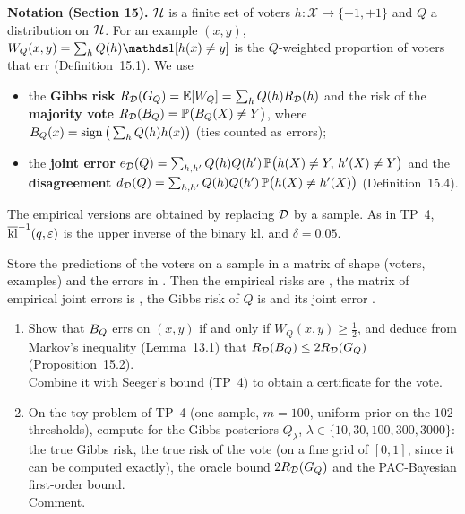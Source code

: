 \documentclass[a4paper,11pt]{article}
\begin{document}
\medskip
\noindent\textbf{Notation (Section 15).} $\mathcal{H}$ is a finite set of voters $h:\mathcal X\to\{-1,+1\}$ and $Q$ a
distribution on $\mathcal{H}$. For an example $(x,y)$, $W_Q(x,y)=\sum_hQ(h)\ind{h(x)\neq y}$ is the $Q$-weighted proportion of
voters that err (Definition~15.1). We use
\begin{itemize}
\item the \textbf{Gibbs risk} $R_{\mathcal{D}}(G_{Q})=\mathbb{E}[W_Q]=\sum_hQ(h)R_{\mathcal{D}}(h)$ and the risk of the \textbf{majority vote}
      $R_{\mathcal{D}}(B_{Q})=\mathbb{P}\big(B_{Q}(X)\neq Y\big)$, where $B_{Q}(x)=\operatorname{sign}\big(\sum_hQ(h)h(x)\big)$ (ties counted as errors);
\item the \textbf{joint error} $e_{\mathcal{D}}(Q)=\sum_{h,h'}Q(h)Q(h')\,\mathbb{P}\big(h(X)\neq Y,\,h'(X)\neq Y\big)$ and the
      \textbf{disagreement} $d_{\mathcal{D}}(Q)=\sum_{h,h'}Q(h)Q(h')\,\mathbb{P}\big(h(X)\neq h'(X)\big)$ (Definition~15.4).
\end{itemize}
The empirical versions are obtained by replacing $\mathcal{D}$ by a sample. As in TP~4, $\overline{\operatorname{kl}}^{-1}(q,\varepsilon)$ is the upper
inverse of the binary kl, and $\delta=0.05$.

\begin{tip}
Store the predictions of the voters on a sample in a matrix  of shape (voters, examples) and the errors in
. Then the empirical risks are , the matrix of empirical joint errors is
, the Gibbs risk of $Q$ is  and its joint error .
\end{tip}

\label{p5:fo}

\begin{enumerate}
\item Show that $B_{Q}$ errs on $(x,y)$ if and only if $W_Q(x,y)\geq\frac12$, and deduce from Markov's inequality
      (Lemma~13.1) that $R_{\mathcal{D}}(B_{Q})\leq2R_{\mathcal{D}}(G_{Q})$ (Proposition~15.2).\\
      Combine it with Seeger's bound (TP~4) to obtain a certificate for the vote.
\item On the toy problem of TP~4 (one sample, $m=100$, uniform prior on the $102$ thresholds), compute for the Gibbs
      posteriors $Q_\lambda$, $\lambda\in\{10,30,100,300,3000\}$: the true Gibbs risk, the true risk of the vote (on a fine
      grid of $[0,1]$, since it can be computed exactly), the oracle bound $2R_{\mathcal{D}}(G_{Q})$ and the PAC-Bayesian first-order
      bound.\\
      Comment.
\end{enumerate}
\end{document}
